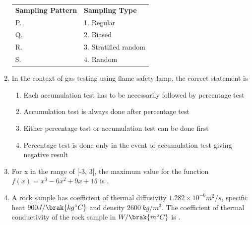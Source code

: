 \documentclass[journal,12pt,onecolumn]{IEEEtran}
\theoremstyle{remark}
\begin{document}
\begin{enumerate}
\begin{figure}[H]
\end{figure}
\begin{center}
\begin{tabular}{ll}
\textbf{Sampling Pattern} & \textbf{Sampling Type} \\
P. & 1. Regular \\
Q. & 2. Biased \\
R. & 3. Stratified random \\
S. & 4. Random \\
\end{tabular}
\end{center}

\hfill{}

\begin{enumerate}
\end{enumerate}

\item In the context of gas testing using flame safety lamp, the correct statement is

\hfill{}

\begin{enumerate}
\item Each accumulation test has to be necessarily followed by percentage test
\item Accumulation test is always done after percentage test
\item Either percentage test or accumulation test can be done first
\item Percentage test is done only in the event of accumulation test giving negative result
\end{enumerate}

\item For x in the range of [-3, 3], the maximum value for the function $f(x)=x^{3}-6x^{2}+9x+15$ is \underline{\hspace{2cm}} .

\hfill{}

\item A rock sample has coefficient of thermal diffusivity $1.282\times10^{-6}m^{2}/s$, specific heat $900 J/\brak{kg^{\circ}C}$ and density $2600~kg/m^{3}.$ The coefficient of thermal conductivity of the rock sample in $W/\brak{m^{\circ}C}$ is \underline{\hspace{2cm}} .


\end{enumerate}
\end{document}
